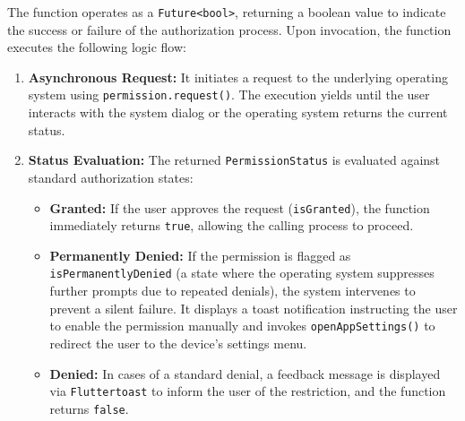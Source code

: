 The function operates as a \texttt{Future<bool>}, returning a boolean value to indicate the success or failure of the authorization process. Upon invocation, the function executes the following logic flow:
\begin{enumerate}
    \item \textbf{Asynchronous Request:} It initiates a request to the underlying operating system using \texttt{permission.request()}. The execution yields until the user interacts with the system dialog or the operating system returns the current status.
    \item \textbf{Status Evaluation:} The returned \texttt{PermissionStatus} is evaluated against standard authorization states:
          \begin{itemize}
              \item \textbf{Granted:} If the user approves the request (\texttt{isGranted}), the function immediately returns \texttt{true}, allowing the calling process to proceed.
              \item \textbf{Permanently Denied:} If the permission is flagged as \texttt{isPermanentlyDenied} (a state where the operating system suppresses further prompts due to repeated denials), the system intervenes to prevent a silent failure. It displays a toast notification instructing the user to enable the permission manually and invokes \texttt{openAppSettings()} to redirect the user to the device’s settings menu.
              \item \textbf{Denied:} In cases of a standard denial, a feedback message is displayed via \texttt{Fluttertoast} to inform the user of the restriction, and the function returns \texttt{false}.
          \end{itemize}
\end{enumerate}

